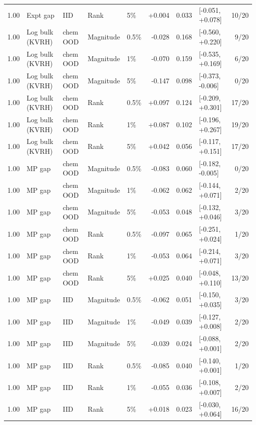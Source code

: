 \begin{longtable}{@{}lllllrrlr@{}}
1.00 & Expt gap & IID & Rank & 5\% & +0.004 & 0.033 & [-0.051, +0.078] & 10/20 \\
1.00 & Log bulk (KVRH) & chem OOD & Magnitude & 0.5\% & -0.028 & 0.168 & [-0.560, +0.220] & 9/20 \\
1.00 & Log bulk (KVRH) & chem OOD & Magnitude & 1\% & -0.070 & 0.159 & [-0.535, +0.169] & 6/20 \\
1.00 & Log bulk (KVRH) & chem OOD & Magnitude & 5\% & -0.147 & 0.098 & [-0.373, -0.006] & 0/20 \\
1.00 & Log bulk (KVRH) & chem OOD & Rank & 0.5\% & +0.097 & 0.124 & [-0.209, +0.301] & 17/20 \\
1.00 & Log bulk (KVRH) & chem OOD & Rank & 1\% & +0.087 & 0.102 & [-0.196, +0.267] & 19/20 \\
1.00 & Log bulk (KVRH) & chem OOD & Rank & 5\% & +0.042 & 0.056 & [-0.117, +0.151] & 17/20 \\
1.00 & MP gap & chem OOD & Magnitude & 0.5\% & -0.083 & 0.060 & [-0.182, -0.005] & 0/20 \\
1.00 & MP gap & chem OOD & Magnitude & 1\% & -0.062 & 0.062 & [-0.144, +0.071] & 2/20 \\
1.00 & MP gap & chem OOD & Magnitude & 5\% & -0.053 & 0.048 & [-0.132, +0.046] & 3/20 \\
1.00 & MP gap & chem OOD & Rank & 0.5\% & -0.097 & 0.065 & [-0.251, +0.024] & 1/20 \\
1.00 & MP gap & chem OOD & Rank & 1\% & -0.053 & 0.064 & [-0.214, +0.071] & 3/20 \\
1.00 & MP gap & chem OOD & Rank & 5\% & +0.025 & 0.040 & [-0.048, +0.110] & 13/20 \\
1.00 & MP gap & IID & Magnitude & 0.5\% & -0.062 & 0.051 & [-0.150, +0.035] & 3/20 \\
1.00 & MP gap & IID & Magnitude & 1\% & -0.049 & 0.039 & [-0.127, +0.008] & 2/20 \\
1.00 & MP gap & IID & Magnitude & 5\% & -0.039 & 0.024 & [-0.088, +0.001] & 2/20 \\
1.00 & MP gap & IID & Rank & 0.5\% & -0.085 & 0.040 & [-0.140, +0.001] & 1/20 \\
1.00 & MP gap & IID & Rank & 1\% & -0.055 & 0.036 & [-0.108, +0.007] & 2/20 \\
1.00 & MP gap & IID & Rank & 5\% & +0.018 & 0.023 & [-0.030, +0.064] & 16/20 \\
\end{longtable}
